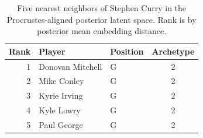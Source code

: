 \begin{table}[htbp]
  \centering\small
  \begin{tabular}{rllc}
    \toprule
    Rank & Player & Position & Archetype \\
    \midrule
    1 & Donovan Mitchell & G & 2 \\
    2 & Mike Conley & G & 2 \\
    3 & Kyrie Irving & G & 2 \\
    4 & Kyle Lowry & G & 2 \\
    5 & Paul George & G & 2 \\
    \bottomrule
  \end{tabular}
  \caption{Five nearest neighbors of Stephen Curry in the Procrustes-aligned posterior latent space. Rank is by posterior mean embedding distance.}
\end{table}

